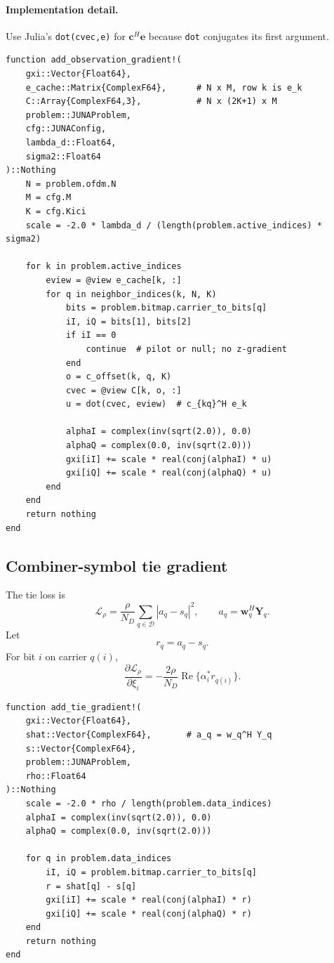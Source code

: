 \documentclass[11pt]{article}
\newcommand{\abs}[1]{\left\lvert #1 \right\rvert}
\newcommand{\re}{\operatorname{Re}}
\begin{document}
\paragraph{Implementation detail.}
Use Julia's \texttt{dot(cvec,e)} for $\mathbf c^H\mathbf e$ because \texttt{dot} conjugates its first argument.

\begin{lstlisting}
function add_observation_gradient!(
    gxi::Vector{Float64},
    e_cache::Matrix{ComplexF64},      # N x M, row k is e_k
    C::Array{ComplexF64,3},           # N x (2K+1) x M
    problem::JUNAProblem,
    cfg::JUNAConfig,
    lambda_d::Float64,
    sigma2::Float64
)::Nothing
    N = problem.ofdm.N
    M = cfg.M
    K = cfg.Kici
    scale = -2.0 * lambda_d / (length(problem.active_indices) * sigma2)

    for k in problem.active_indices
        eview = @view e_cache[k, :]
        for q in neighbor_indices(k, N, K)
            bits = problem.bitmap.carrier_to_bits[q]
            iI, iQ = bits[1], bits[2]
            if iI == 0
                continue  # pilot or null; no z-gradient
            end
            o = c_offset(k, q, K)
            cvec = @view C[k, o, :]
            u = dot(cvec, eview)  # c_{kq}^H e_k

            alphaI = complex(inv(sqrt(2.0)), 0.0)
            alphaQ = complex(0.0, inv(sqrt(2.0)))
            gxi[iI] += scale * real(conj(alphaI) * u)
            gxi[iQ] += scale * real(conj(alphaQ) * u)
        end
    end
    return nothing
end
\end{lstlisting}

\subsection{Combiner-symbol tie gradient}

The tie loss is
\begin{equation}
\mathcal L_\rho
=\frac{\rho}{N_D}\sum_{q\in\mathcal D}\abs{a_q-s_q}^2,
\qquad
 a_q=\mathbf w_q^H\mathbf Y_q.
\end{equation}
Let
\begin{equation}
 r_q=a_q-s_q.
\end{equation}
For bit $i$ on carrier $q(i)$,
\begin{equation}
\frac{\partial \mathcal L_\rho}{\partial\xi_i}
=-\frac{2\rho}{N_D}\re\{\alpha_i^*r_{q(i)}\}.
\label{eq:grad_tie}
\end{equation}

\begin{lstlisting}
function add_tie_gradient!(
    gxi::Vector{Float64},
    shat::Vector{ComplexF64},       # a_q = w_q^H Y_q
    s::Vector{ComplexF64},
    problem::JUNAProblem,
    rho::Float64
)::Nothing
    scale = -2.0 * rho / length(problem.data_indices)
    alphaI = complex(inv(sqrt(2.0)), 0.0)
    alphaQ = complex(0.0, inv(sqrt(2.0)))

    for q in problem.data_indices
        iI, iQ = problem.bitmap.carrier_to_bits[q]
        r = shat[q] - s[q]
        gxi[iI] += scale * real(conj(alphaI) * r)
        gxi[iQ] += scale * real(conj(alphaQ) * r)
    end
    return nothing
end
\end{lstlisting}
\end{document}
